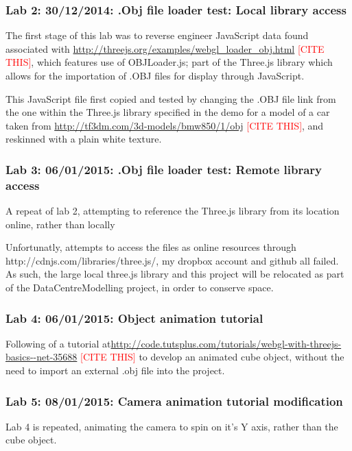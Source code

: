 \subsubsection{Lab 2: 30/12/2014: .Obj file loader test: Local library access}
\label{subSubSec:ThreeJSExperiments:Lab2}
The first stage of this lab was to reverse engineer JavaScript data found associated with \url{http://threejs.org/examples/webgl_loader_obj.html} \textcolor{red}{[CITE THIS]}, which features use of OBJLoader.js; part of the Three.js library which allows for the importation of .OBJ files for display through JavaScript.

This JavaScript file first copied and tested by changing the .OBJ file link from the one within the Three.js library specified in the demo for a model of a car taken from \url{http://tf3dm.com/3d-models/bmw850/1/obj} \textcolor{red}{[CITE THIS]}, and reskinned with a plain white texture.

\subsubsection{Lab 3: 06/01/2015: .Obj file loader test: Remote library access}
\label{subSubSec:ThreeJSExperiments:Lab3}
A repeat of lab 2, attempting to reference the Three.js library from its location online, rather than locally

Unfortunatly, attempts to access the files as online resources through http://cdnjs.com/libraries/three.js/, my dropbox account and github all failed. As such, the large local three.js library and this project will be relocated as part of the DataCentreModelling project, in order to conserve space.

\subsubsection{Lab 4: 06/01/2015: Object animation tutorial}
\label{subSubSec:ThreeJSExperiments:Lab4}
Following of a tutorial at\url{http://code.tutsplus.com/tutorials/webgl-with-threejs-basics--net-35688} \textcolor{red}{[CITE THIS]} to develop an animated cube object, without the need to import an external .obj file into the project.

\subsubsection{Lab 5: 08/01/2015: Camera animation tutorial modification}
\label{subSubSec:ThreeJSExperiments:Lab5}
Lab 4 is repeated, animating the camera to spin on it's Y axis, rather than the cube object.


